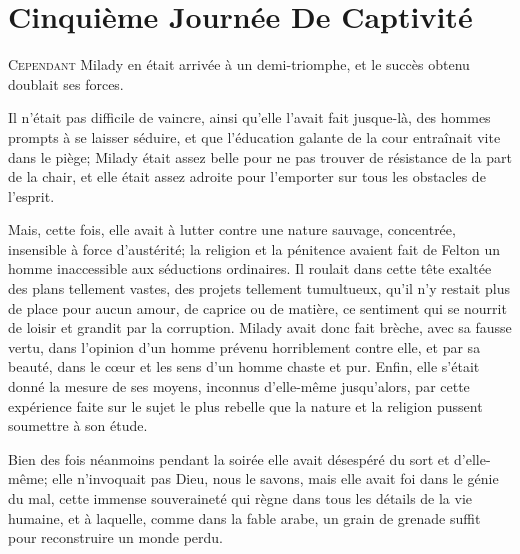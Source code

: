 
\chapter{Cinquième Journée De Captivité}

\lettrine{C}{ependant} Milady en était arrivée à un demi-triomphe, et le succès obtenu doublait ses forces. 

\zz
Il n'était pas difficile de vaincre, ainsi qu'elle l'avait fait jusque-là, des hommes prompts à se laisser séduire, et que l'éducation galante de la cour entraînait vite dans le piège; Milady était assez belle pour ne pas trouver de résistance de la part de la chair, et elle était assez adroite pour l'emporter sur tous les obstacles de l'esprit. 

Mais, cette fois, elle avait à lutter contre une nature sauvage, concentrée, insensible à force d'austérité; la religion et la pénitence avaient fait de Felton un homme inaccessible aux séductions ordinaires. Il roulait dans cette tête exaltée des plans tellement vastes, des projets tellement tumultueux, qu'il n'y restait plus de place pour aucun amour, de caprice ou de matière, ce sentiment qui se nourrit de loisir et grandit par la corruption. Milady avait donc fait brèche, avec sa fausse vertu, dans l'opinion d'un homme prévenu horriblement contre elle, et par sa beauté, dans le cœur et les sens d'un homme chaste et pur. Enfin, elle s'était donné la mesure de ses moyens, inconnus d'elle-même jusqu'alors, par cette expérience faite sur le sujet le plus rebelle que la nature et la religion pussent soumettre à son étude. 

Bien des fois néanmoins pendant la soirée elle avait désespéré du sort et d'elle-même; elle n'invoquait pas Dieu, nous le savons, mais elle avait foi dans le génie du mal, cette immense souveraineté qui règne dans tous les détails de la vie humaine, et à laquelle, comme dans la fable arabe, un grain de grenade suffit pour reconstruire un monde perdu. 


